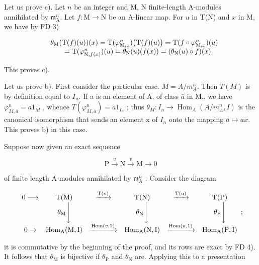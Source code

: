 Let us prove c). Let \(n\) be an integer and M, N finite-length A-modules annihilated by \(\mathfrak{m}_{\mathrm{A}}^{n}\). Let \(f: \mathrm{M} \to \mathrm{N}\) be an A-linear map. For \(u\) in T(N) and \(x\) in M, we have by FD 3)

\[
\begin{array}{r l} & {\theta_ {\mathrm{M}} (\mathrm{T} (f) (u)) (x) = \mathrm{T} (\varphi_ {\mathrm{M}, x} ^ {n}) \big (\mathrm{T} (f) (u) \big) = \mathrm{T} (f \circ \varphi_ {\mathrm{M}, x} ^ {n}) (u)} \\ & {\qquad = \mathrm{T} (\varphi_ {\mathrm{N}, f (x)} ^ {n}) (u) = \theta_ {\mathrm{N}} (u) (f (x)) = (\theta_ {\mathrm{N}} (u) \circ f) (x).} \end{array}
\]

This proves c).

Let us prove b). First consider the particular case. \(M = A/m_{A}^{n}\). Then \(T(M)\) is by definition equal to \(I_{n}\). If a is an element of A, of class \(\bar{a}\) in M,, we have \(\varphi_{M,\bar{a}}^{n} = a1_{M}\) , whence \(T(\varphi_{M,\bar{a}}^{n}) = a1_{I_{n}}\) ; thus \(\theta_{M}: I_{n} \longrightarrow \operatorname{Hom}_{A}(A/m_{A}^{n}, I)\) is the canonical isomorphism that sends an element x of \(I_{n}\) onto the mapping \(\bar{a} \mapsto ax\). This proves b) in this case.

Suppose now given an exact sequence

\[
\mathrm{P} \xrightarrow {u} \mathrm{N} \xrightarrow {v} \mathrm{M} \to 0
\]

of finite length A-modules annihilated by \(\mathfrak{m}_{\mathrm{A}}^{n}\) . Consider the diagram

\[
\begin{array}{c c c c c c} 0 \longrightarrow & \mathrm{T(M)} & \xrightarrow {\mathrm{T(v)}} & \mathrm{T(N)} & \xrightarrow {\mathrm{T(u)}} & \mathrm{T(P)} \\ & \theta_ {\mathrm{M}} \Bigg \downarrow & & \theta_ {\mathrm{N}} \Bigg \downarrow & & \theta_ {\mathrm{P}} \Bigg \downarrow \\ 0 \to & \operatorname{Hom} _ {\mathrm{A}} (\mathrm{M}, \mathrm{I}) & \xrightarrow {\operatorname{Hom} (v , 1)} & \operatorname{Hom} _ {\mathrm{A}} (\mathrm{N}, \mathrm{I}) & \xrightarrow {\operatorname{Hom} (u , 1)} & \operatorname{Hom} _ {\mathrm{A}} (\mathrm{P}, \mathrm{I}) \end{array} ;
\]

it is commutative by the beginning of the proof, and its rows are exact by FD 4). It follows that \(\theta_{\mathrm{M}}\) is bijective if \(\theta_{\mathrm{P}}\) and \(\theta_{\mathrm{N}}\) are. Applying this to a presentation

